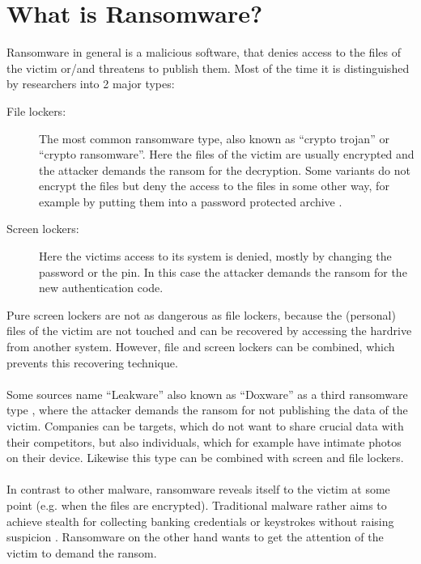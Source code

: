 \section{What is Ransomware?}

Ransomware in general is a malicious software, that denies access to the files of the victim or/and threatens to publish them. Most of the time it is distinguished by researchers into 2 major types:

\begin{description}
\item[File lockers:] The most common ransomware type, also known as ``crypto trojan'' or ``crypto ransomware''. Here the files of the victim are usually encrypted and the attacker demands the ransom for the decryption. Some variants do not encrypt the files but deny the access to the files in some other way, for example by putting them into a password protected archive \cite{Symantec2017a}.
  
\item[Screen lockers:] Here the victims access to its system is denied, mostly by changing the password or the pin. In this case the attacker demands the ransom for the new authentication code.
\end{description} 

Pure screen lockers are not as dangerous as file lockers, because the (personal) files of the victim are not touched and can be recovered by accessing the hardrive from another system. However, file and screen lockers can be combined, which prevents this recovering technique.\\
\\
Some sources name ``Leakware'' also known as ``Doxware'' as a third ransomware type \cite{Upadhaya2017}, where the attacker demands the ransom for not publishing the data of the victim. Companies can be targets, which do not want to share crucial data with their competitors, but also individuals, which for example have intimate photos on their device. Likewise this type can be combined with screen and file lockers.\\
\\
In contrast to other malware, ransomware reveals itself to the victim at some point (e.g. when the files are encrypted). Traditional malware rather aims to achieve stealth for collecting banking credentials or keystrokes without raising suspicion \cite{Kirda2017}. Ransomware on the other hand wants to get the attention of the victim to demand the ransom.
